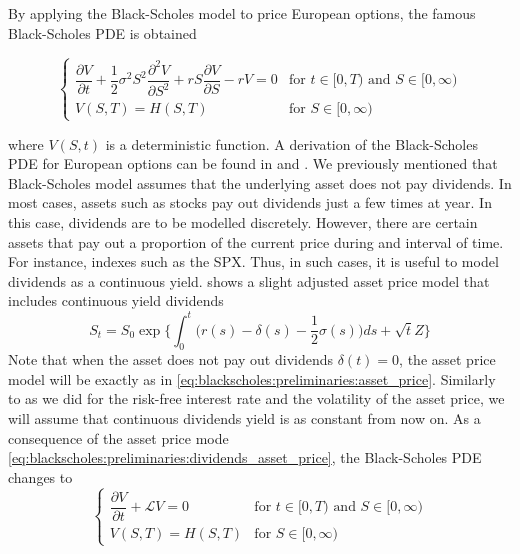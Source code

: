 By applying the Black-Scholes model to price European options, the famous
Black-Scholes PDE is obtained

\begin{equation*}
  \begin{cases}
    \dfrac{\partial{V}}{\partial{t}} + \dfrac{1}{2}\sigma^{2} S^2 \dfrac{\partial^2{V}}{\partial{S^2}} + r S \dfrac{\partial{V}}{\partial{S}} - rV = 0 & \text{for $t\in[0,T)$ and $S\in[0, \infty)$} \\ V(S, T) =
    H(S, T) & \text{for $S\in[0, \infty)$}
  \end{cases}
  \label{eq:blackscholes:preliminaries:european_option_pde}
\end{equation*}

where $V(S, t)$ is a deterministic function. A derivation of the Black-Scholes PDE for European options can be found in \cite{merton_1973} and \cite{wilmott_howison_dewynne_1995}. We previously mentioned that Black-Scholes model assumes that the underlying asset does not pay dividends. In most cases, assets such as stocks pay out dividends just a few times at year. In this case, dividends are to be modelled discretely. However, there are certain assets that pay out a proportion of the current price during and interval of time. For instance, indexes such as the SPX. Thus, in such cases, it is useful to model dividends as a continuous yield. \cite{wilmott_howison_dewynne_1995} shows a slight adjusted asset price model that includes continuous yield dividends
\begin{equation}
  S_t = S_0 \exp\bigg\{\int_{0}^{t} \big(r(s) - \delta(s) - \dfrac{1}{2}\sigma(s)\big)ds + \sqrt{t}Z\bigg\}
  \label{eq:blackscholes:preliminaries:dividends_asset_price}
\end{equation}
Note that when the asset does not pay out dividends $\delta(t) = 0$, the asset price model will be exactly as in \eqref{eq:blackscholes:preliminaries:asset_price}. Similarly to as we did for the risk-free interest rate and the volatility of the asset price, we will assume that continuous dividends yield is as constant from now on. As a consequence of
the asset price mode \eqref{eq:blackscholes:preliminaries:dividends_asset_price}, the Black-Scholes PDE changes to 
\begin{equation}
  \begin{cases}
    \dfrac{\partial{V}}{\partial{t}} + \mathcal{L}V = 0 & \text{for $t\in[0,T)$ and $S\in[0, \infty)$} \\ 
    V(S, T) = H(S,T) & \text{for $S\in[0, \infty)$}
  \end{cases}
  \label{eq:chapter2:european_option_pde_with_dividens}
\end{equation}


